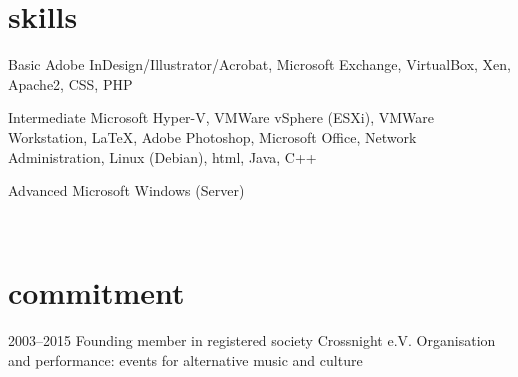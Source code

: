 \documentclass[]{friggeri-cv} %
\begin{document}

\section{skills}

\begin{entrylist}


\entry
{Basic}
{Adobe InDesign/Illustrator/Acrobat, Microsoft Exchange, VirtualBox, Xen, Apache2, CSS, PHP}
{}

\entry
{Intermediate}
{Microsoft Hyper-V, VMWare vSphere (ESXi), VMWare Workstation, LaTeX, Adobe Photoshop, Microsoft Office, Network Administration, Linux (Debian), html, Java, C++}
{}

\entry
{Advanced}
{Microsoft Windows (Server)}
{}

\\
\end{entrylist}




\section{commitment}

\begin{entrylist}


\entry
{2003--2015}
{Founding member in registered society Crossnight e.V.}
{}
{Organisation and performance: events for alternative music and culture}


\end{entrylist}

\end{document}
